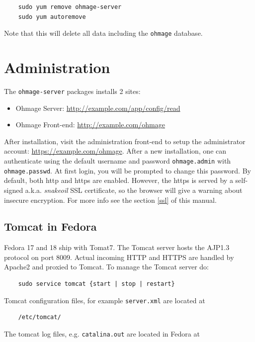 \documentclass{scrartcl}
\begin{document}
\begin{verbatim}
    sudo yum remove ohmage-server
    sudo yum autoremove
\end{verbatim}
Note that this will delete all data including the \texttt{ohmage} database.

\section{Administration}

The \texttt{ohmage-server} packages installs 2 sites:

\begin{itemize}
  \item Ohmage Server: \url{http://example.com/app/config/read}
  \item Ohmage Front-end: \url{http://example.com/ohmage}
\end{itemize}

\noindent After installation, visit the administration front-end to setup the
administrator account: \url{https://example.com/ohmage}. After a new
installation, one can authenticate using the default username and password
\texttt{ohmage.admin} with \texttt{ohmage.passwd}. At first login, you will be
prompted to change this password. By default, both http and https are enabled.
However, the https is served by a self-signed a.k.a. \emph{snakeoil} SSL
certificate, so the browser will give a warning about insecure encryption.
For more info see the section \ref{ssl} of this manual.

\subsection{Tomcat in Fedora}

Fedora 17 and 18 ship with Tomat7. The Tomcat server hosts the AJP1.3 protocol
on port 8009. Actual incoming HTTP and HTTPS are handled by Apache2 and proxied
to Tomcat. To manage the Tomcat server do:

\begin{verbatim}
    sudo service tomcat {start | stop | restart}
\end{verbatim}

Tomcat configuration files, for example \texttt{server.xml} are located at

\begin{verbatim}
    /etc/tomcat/
\end{verbatim}

The tomcat log files, e.g. \texttt{catalina.out} are located in Fedora at
\end{document}
